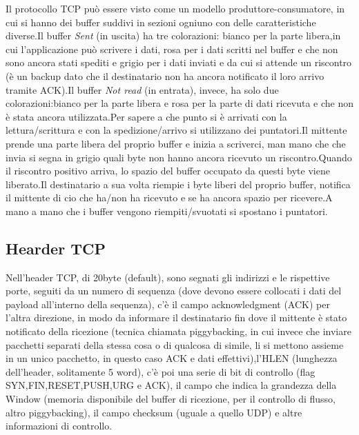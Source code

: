 Il protocollo TCP può essere visto come un modello produttore-consumatore, in cui si hanno dei buffer suddivi in sezioni ogniuno con delle caratteristiche diverse.Il buffer \textit{Sent} (in uscita) ha tre colorazioni: bianco per la parte libera,in cui l'applicazione può scrivere i dati, rosa per i dati scritti nel buffer e che non sono ancora stati spediti e grigio per i dati inviati e da cui si attende un riscontro (è un backup dato che il destinatario non ha ancora notificato il loro arrivo tramite ACK).Il buffer \textit{Not read} (in entrata), invece, ha solo due colorazioni:bianco per la parte libera e rosa per la parte di dati ricevuta e che non è stata ancora utilizzata.Per sapere a che punto si è arrivati con la lettura/scrittura e con la spedizione/arrivo si utilizzano dei puntatori.Il mittente prende una parte libera del proprio buffer e inizia a scriverci, man mano che che invia si segna in grigio quali byte non hanno ancora ricevuto un riscontro.Quando il riscontro positivo arriva, lo spazio del buffer occupato da questi byte viene liberato.Il destinatario a sua volta riempie i byte liberi del proprio buffer, notifica il mittente di cio che ha/non ha ricevuto e se ha ancora spazio per ricevere.A mano a mano che i buffer vengono riempiti/svuotati si spostano i puntatori.
\subsection{Hearder TCP}
Nell'header TCP, di 20byte (default), sono segnati gli indirizzi e le rispettive porte, seguiti da un numero di sequenza (dove devono essere collocati i dati del payload all'interno della sequenza), c'è il campo acknowledgment (ACK) per l'altra direzione, in modo da informare il destinatario fin dove il mittente è stato notificato della ricezione (tecnica chiamata piggybacking, in cui invece che inviare pacchetti separati della stessa cosa o di qualcosa di simile, li si mettono assieme in un unico pacchetto, in questo caso ACK e dati effettivi),l'HLEN (lunghezza dell'header, solitamente 5 word), c'è poi una serie di bit di controllo (flag SYN,FIN,RESET,PUSH,URG e ACK), il campo che indica la grandezza della Window (memoria disponibile del buffer di ricezione, per il controllo di flusso, altro piggybacking), il campo checksum (uguale a quello UDP) e altre informazioni di controllo.
